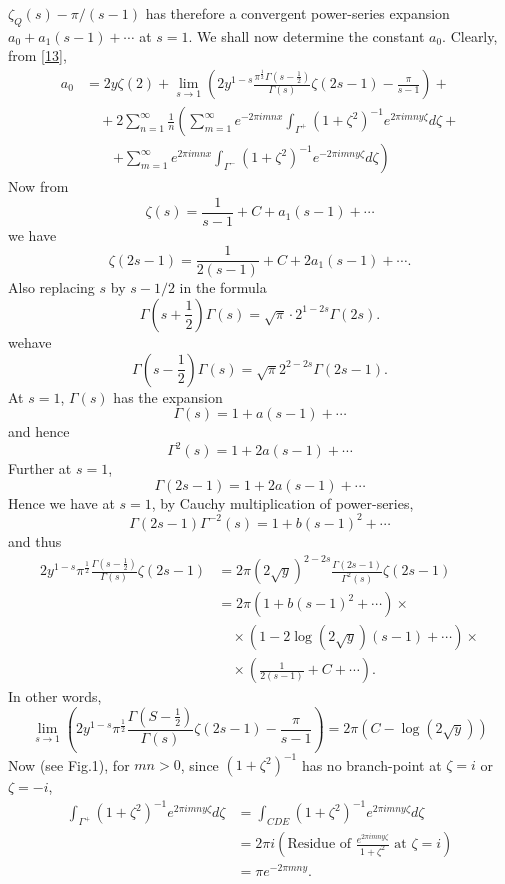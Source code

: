 $\zeta_{Q}(s)-\pi/(s-1)$ has therefore a convergent power-series
expansion $a_{0}+a_{1}(s-1)+\cdots$ at $s=1$. We shall now determine
the constant $a_{0}$. Clearly, from \eqref{13},
\begin{align*}
a_{0}&= 2y\zeta(2)+\lim\limits_{s\to
  1}\left(2y^{1-s}\frac{\pi^{\frac{1}{2}}\Gamma(s-\frac{1}{2})}{\Gamma(s)}\zeta(2s-1)-\frac{\pi}{s-1}\right)
+\\
&\quad
+2\sum^{\infty}_{n=1}\frac{1}{n}\left(\sum^{\infty}_{m=1}e^{-2\pi
  imnx}\int_{\Gamma^{+}}(1+\zeta^{2})^{-1}e^{2\pi
  imny\zeta}d\zeta+\right.\\
&\qquad \left. +\sum^{\infty}_{m=1}e^{2\pi
  imnx}\int_{\Gamma^{-}}(1+\zeta^{2})^{-1}e^{-2\pi imny\zeta}d\zeta\right)
\end{align*}
Now from
$$
\zeta(s)=\frac{1}{s-1}+C+a_{1}(s-1)+\cdots
$$
we have
$$
\zeta(2s-1)=\frac{1}{2(s-1)}+C+2a_{1}(s-1)+\cdots.
$$
Also replacing $s$ by $s-1/2$ in the formula
$$
\Gamma\left(s+\frac{1}{2}\right)\Gamma(s)=\sqrt{\pi}\cdot
2^{1-2s}\Gamma(2s).
$$
we\pageoriginale have
$$
\Gamma\left(s-\frac{1}{2}\right)\Gamma(s)=\sqrt{\pi}2^{2-2s}\Gamma(2s-1).
$$
At $s=1$, $\Gamma(s)$ has the expansion
$$
\Gamma(s)=1+a(s-1)+\cdots
$$
and hence
$$
\Gamma^{2}(s)=1+2a(s-1)+\cdots
$$
Further at $s=1$,
$$
\Gamma(2s-1)=1+2a(s-1)+\cdots
$$
Hence we have at $s=1$, by Cauchy multiplication of power-series,
$$
\Gamma(2s-1)\Gamma^{-2}(s)=1+b(s-1)^{2}+\cdots
$$
and thus
\begin{align*}
2y^{1-s}\pi^{\frac{1}{2}}\frac{\Gamma(s-\frac{1}{2})}{\Gamma(s)}\zeta(2s-1)
&= 2\pi
(2\sqrt{y})^{2-2s}\frac{\Gamma(2s-1)}{\Gamma^{2}(s)}\zeta(2s-1)\\
&= 2\pi(1+b(s-1)^{2}+\cdots)\times\\
&\quad \times(1-2\log(2\sqrt{y})(s-1)+\cdots)\times\\
&\quad \times\left(\frac{1}{2(s-1)}+C+\cdots\right).
\end{align*}
In other words,
$$
\lim\limits_{s\to
  1}\left(2y^{1-s}\pi^{\frac{1}{2}}\frac{\Gamma(S-\frac{1}{2})}{\Gamma(s)}\zeta(2s-1)-\frac{\pi}{s-1}\right)=2\pi(C-\log(2\sqrt{y})) 
$$
Now (see Fig.\@ 1), for $mn>0$, since $(1+\zeta^{2})^{-1}$ has no
branch-point at $\zeta=i$ or $\zeta=-i$,
\begin{align*}
\int_{\Gamma^{+}}(1+\zeta^{2})^{-1}e^{2\pi imny\zeta}d\zeta &=
\int_{CDE}(1+\zeta^{2})^{-1}e^{2\pi imny\zeta}d\zeta\\
&= 2\pi i\left(\text{Residue of } \frac{e^{2\pi
    imny\zeta}}{1+\zeta^{2}}\text{ at } \zeta=i\right)\\
&= \pi e^{-2\pi mny}.
\end{align*}\pageoriginale
